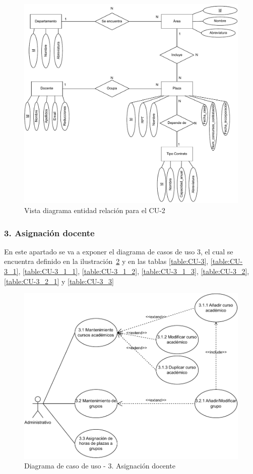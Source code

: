 \begin{figure}[!h]
	\centering
	\includegraphics[scale=0.7]{../img/Anexos/Casos uso/Vistas ER/Diagrama E-R CU 2.pdf}
	\caption{Vista diagrama entidad relación para el CU-2}\label{er_cu2}
\end{figure}
\FloatBarrier

\newpage
\subsubsection{3. Asignación docente}

En este apartado se va a exponer el diagrama de casos de uso 3, el cual se encuentra definido en la ilustración~\ref{fig:CU-3} y en las tablas \ref{table:CU-3}, \ref{table:CU-3_1}, \ref{table:CU-3_1_1}, \ref{table:CU-3_1_2}, \ref{table:CU-3_1_3}, \ref{table:CU-3_2}, \ref{table:CU-3_2_1} y \ref{table:CU-3_3}

\begin{figure}[!h]
	\centering
	\includegraphics[scale=0.9]{../img/Anexos/Casos uso/Diagrama casos de uso 4.pdf}
	\caption{Diagrama de caso de uso - 3. Asignación docente}\label{fig:CU-3}
\end{figure}
\FloatBarrier

